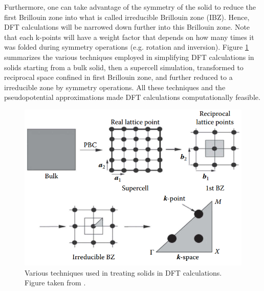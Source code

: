Furthermore, one can take advantage of the symmetry of the solid to reduce the first Brillouin zone into what is called irreducible Brillouin zone (IBZ). Hence, DFT calculations will be narrowed down further into this Brillouin zone. Note that each k-points will have a weight factor that depends on how many times it was folded during symmetry operations (e.g. rotation and inversion). Figure \ref{fig:dft_solid} summarizes the various techniques employed in simplifying DFT calculations in solids starting from a bulk solid, then a supercell simulation, transformed to reciprocal space confined in first Brillouin zone, and further reduced to a irreducible zone by symmetry operations. All these techniques and the pseudopotential approximations made DFT calculations computationally feasible.
\begin{figure}[tbh!]
    \centering
    \includegraphics[width=0.6\linewidth]{"images/computational/dft_solid"}
    \caption[Various techniques used in treating solids in DFT calculations.]{Various techniques used in treating solids in DFT calculations. Figure taken from \citep{Lee2016}.}
    \label{fig:dft_solid}
\end{figure}

